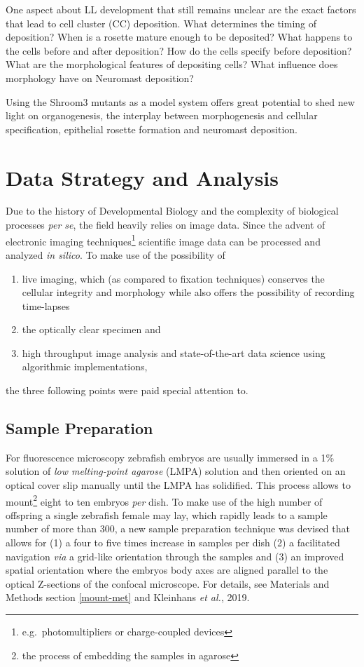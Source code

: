 \documentclass[11pt,singlespacinge,twoside]{reedthesis} %
\providecommand{\tightlist}{%
  \setlength{\itemsep}{0pt}\setlength{\parskip}{0pt}}
\begin{document}
One aspect about LL development that still remains unclear are the exact factors that lead to cell cluster (CC) deposition. What determines the timing of deposition? When is a rosette mature enough to be deposited? What happens to the cells before and after deposition? How do the cells specify before deposition? What are the morphological features of depositing cells? What influence does morphology have on Neuromast deposition?

Using the Shroom3 mutants as a model system offers great potential to shed new light on organogenesis, the interplay between morphogenesis and cellular specification, epithelial rosette formation and neuromast deposition.

\hypertarget{data-strategy-and-analysis}{%
\section{Data Strategy and Analysis}\label{data-strategy-and-analysis}}

Due to the history of Developmental Biology and the complexity of biological processes \emph{per se}, the field heavily relies on image data. Since the advent of electronic imaging techniques\footnote{e.g.~photomultipliers or charge-coupled devices} scientific image data can be processed and analyzed \emph{in silico}. To make use of the possibility of
\begin{enumerate}
\def\labelenumi{\arabic{enumi}.}
\tightlist
\item
  live imaging, which (as compared to fixation techniques) conserves the cellular integrity and morphology while also offers the possibility of recording time-lapses
\item
  the optically clear specimen and
\item
  high throughput image analysis and state-of-the-art data science using algorithmic implementations,
\end{enumerate}
the three following points were paid special attention to.

\hypertarget{sample-preparation}{%
\subsection{Sample Preparation}\label{sample-preparation}}

For fluorescence microscopy zebrafish embryos are usually immersed in a 1\% solution of \emph{low melting-point agarose} (LMPA) solution and then oriented on an optical cover slip manually until the LMPA has solidified. This process allows to mount\footnote{the process of embedding the samples in agarose} eight to ten embryos \emph{per} dish. To make use of the high number of offspring a single zebrafish female may lay, which rapidly leads to a sample number of more than 300, a new sample preparation technique was devised that allows for (1) a four to five times increase in samples per dish (2) a facilitated navigation \emph{via} a grid-like orientation through the samples and (3) an improved spatial orientation where the embryos body axes are aligned parallel to the optical Z-sections of the confocal microscope. For details, see Materials and Methods section \ref{mount-met} and Kleinhans \emph{et al.}, 2019.
\end{document}
